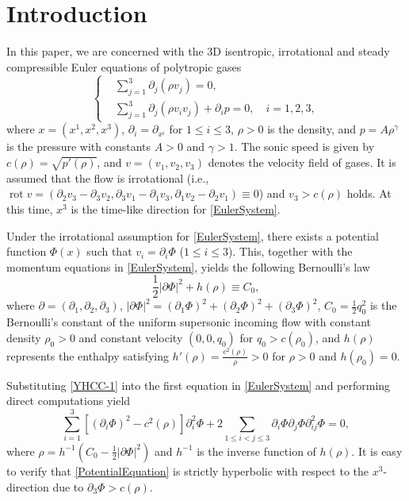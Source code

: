 \documentclass[11pt,twoside]{article}
\def\f{\frac}
\def\p{\partial}
\begin{document}
\section{Introduction}\label{Section 1}
In this paper, we are concerned with the 3D isentropic, irrotational and steady compressible Euler equations
of polytropic gases
\begin{equation}\label{EulerSystem}
\left\{
\begin{aligned}
&\displaystyle\sum_{j = 1}^{3} \partial_{j} \left( \rho v_{j} \right) = 0, \\
&\displaystyle\sum_{j = 1}^{3} \partial_{j} \left( \rho v_{i} v_{j} \right) + \partial_{i} p = 0 ,\quad i = 1, 2, 3,
\end{aligned}
\right.
\end{equation}
where $x = (x^1, x^2, x^3)$, $\partial_i= \partial_{x^i}$ for $1\le i\le 3$, $\rho>0$ is the density, and $p=A\rho^{\gamma}$ is the pressure
with constants $A>0$ and $\gamma>1$. The sonic speed is given by $c(\rho)=\sqrt{p'(\rho)}$, and $v= \left( v_1, v_2, v_3 \right)$ denotes the velocity field of gases. It is assumed that the flow is irrotational (i.e.,
$\operatorname{rot}v
=(\p_2v_3-\p_3v_2,\p_3v_1-\p_1v_3,
\p_1v_2-\p_2v_1)\equiv0$) and $v_3>c(\rho)$ holds. At this time,  $x^3$ is the time-like direction for \eqref{EulerSystem}.


Under the irrotational assumption for \eqref{EulerSystem}, there exists a potential function $\Phi(x)$
such that $v_i = \partial_i \Phi$ ($1\le i\le 3$). This, together with the momentum equations in \eqref{EulerSystem},
yields the following Bernoulli's law
\begin{equation}\label{YHCC-1}
\frac{1}{2} |\p\Phi|^2 + h(\rho) \equiv C_0,
\end{equation}
where $\p=(\p_1,\p_2,\p_3)$, $|\p\Phi|^2=(\p_1\Phi)^2+(\p_2\Phi)^2+(\p_3\Phi)^2$, $C_0=\f12q_0^2$ is the
Bernoulli's constant of the uniform supersonic incoming flow
with constant density $\rho_0>0$ and constant velocity $(0,0,q_0)$ for $q_0>c(\rho_0)$,
and $h(\rho)$ represents the enthalpy satisfying $h'(\rho) = \frac{c^2(\rho)}{\rho}>0$ for $\rho>0$ and $h(\rho_0)=0$.




Substituting \eqref{YHCC-1} into the first equation in \eqref{EulerSystem} and performing direct computations  yield
\begin{equation}\label{PotentialEquation}
\sum_{i = 1}^{3}[\left(\partial_i\Phi\right)^2-c^2(\rho)]\partial_i^2\Phi+2\sum_{1\leq i<j\leq 3}\partial_i\Phi\partial_j\Phi\partial_{ij}^2\Phi = 0,
\end{equation}
where $\rho=h^{-1}(C_0-\tfrac 12|\p\Phi|^2)$ and $h^{-1}$ is the inverse function of $h(\rho)$.
It is easy to verify that \eqref{PotentialEquation} is strictly hyperbolic with respect to the $x^3$-direction due to $\p_3\Phi>c(\rho)$.
\end{document}
